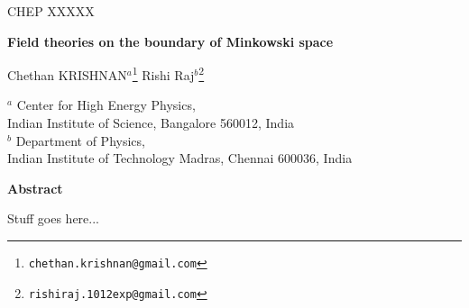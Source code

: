 \documentclass[a4paper,12pt]{article}
\makeatletter
\def\small{\@setsize\small{13.6pt}\xipt\@xipt
\abovedisplayskip 13pt plus3pt minus3pt%
\belowdisplayskip \abovedisplayskip
\abovedisplayshortskip \z@ plus3pt%
\belowdisplayshortskip 7pt plus3.5pt minus0pt
\def\@listi{\parsep 4.5pt plus 2pt minus 1pt
     \itemsep \parsep
     \topsep 9pt plus 3pt minus 3pt}}
\makeatother
\begin{document}
\renewcommand{\d}[1]{\text{d} #1}
\newcommand{\B}[1]{\boldsymbol{#1}}
\newcommand{\vv}{\\[0.1ex] &\hspace{0.5cm}}


\begin{titlepage}
\begin{flushright}
CHEP XXXXX
\end{flushright}
\bigskip
\def\thefootnote{\fnsymbol{footnote}}

\begin{center}
{\Large
{\bf Field theories on the boundary of Minkowski space
}
}
\end{center}
\begin{center}

\bigskip

Chethan KRISHNAN$^a$\footnote{\texttt{chethan.krishnan@gmail.com}}
Rishi Raj$^b$\footnote{\texttt{rishiraj.1012exp@gmail.com}}
\vspace{0.1in}

\end{center}

\renewcommand{\thefootnote}{\arabic{footnote}}


\begin{center}


$^a$ {Center for High Energy Physics,\\
Indian Institute of Science, Bangalore 560012, India}\\

$^b$ {Department of Physics, \\
Indian Institute of Technology Madras, Chennai 600036, India}\\

\end{center}

\noindent
\begin{center} {\bf Abstract} \end{center} 

Stuff goes here...


\vspace{1.6 cm}
\vfill

\end{titlepage}
\end{document}
